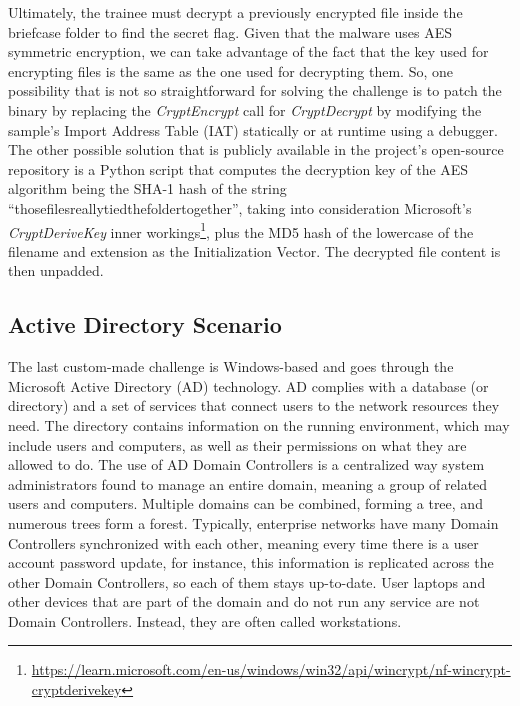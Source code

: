 Ultimately, the trainee must decrypt a previously encrypted file inside the briefcase folder to find the secret flag. Given that the malware uses AES symmetric encryption, we can take advantage of the fact that the key used for encrypting files is the same as the one used for decrypting them. So, one possibility that is not so straightforward for solving the challenge is to patch the binary by replacing the \textit{CryptEncrypt} call for \textit{CryptDecrypt} by modifying the sample's Import Address Table (IAT) statically or at runtime using a debugger. The other possible solution that is publicly available in the project's open-source repository is a Python script that computes the decryption key of the AES algorithm being the SHA-1 hash of the string ``thosefilesreallytiedthefoldertogether'', taking into consideration Microsoft's \textit{CryptDeriveKey} inner workings\footnote{\url{https://learn.microsoft.com/en-us/windows/win32/api/wincrypt/nf-wincrypt-cryptderivekey}}, plus the MD5 hash of the lowercase of the filename and extension as the Initialization Vector. The decrypted file content is then unpadded.


\subsection{Active Directory Scenario} \label{sec:validation_ad_scenario}

The last custom-made challenge is Windows-based and goes through the Microsoft Active Directory (AD) technology. AD complies with a database (or directory) and a set of services that connect users to the network resources they need. The directory contains information on the running environment, which may include users and computers, as well as their permissions on what they are allowed to do. The use of AD Domain Controllers is a centralized way system administrators found to manage an entire domain, meaning a group of related users and computers. Multiple domains can be combined, forming a tree, and numerous trees form a forest. Typically, enterprise networks have many Domain Controllers synchronized with each other, meaning every time there is a user account password update, for instance, this information is replicated across the other Domain Controllers, so each of them stays up-to-date. User laptops and other devices that are part of the domain and do not run any service are not Domain Controllers. Instead, they are often called workstations.

